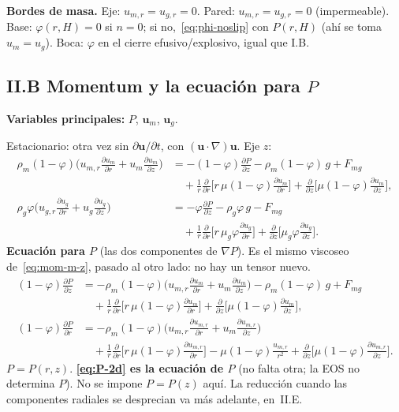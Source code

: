 \documentclass[11pt,a4paper]{article}
\newcommand{\p}{\partial}
\begin{document}
\textbf{Bordes de masa.}
Eje: $u_{m,r}=u_{g,r}=0$.
Pared: $u_{m,r}=u_{g,r}=0$ (impermeable).
Base: $\varphi(r,H)=0$ si $n=0$; si no,~\eqref{eq:phi-noslip}
con $P(r,H)$ (ahí se toma $u_m=u_g$).
Boca: $\varphi$ en el cierre efusivo/explosivo, igual que I.B.

\subsection*{II.B Momentum y la ecuación para $P$}

\textbf{Variables principales:} $P$, $\mathbf{u}_m$,
$\mathbf{u}_g$.

Estacionario: otra vez sin $\p\mathbf{u}/\p t$, con
$(\mathbf{u}\cdot\nabla)\mathbf{u}$. Eje $z$:
\begin{align}
\label{eq:mom-m-z}
\rho_m(1-\varphi)\Biggl(
u_{m,r}\frac{\p u_m}{\p r}+u_m\frac{\p u_m}{\p z}
\Biggr)
&=
-(1-\varphi)\frac{\p P}{\p z}
-\rho_m(1-\varphi)\,g
+F_{mg}
\nonumber\\
&\quad
+\frac{1}{r}\frac{\p}{\p r}\Biggl[
r\,\mu(1-\varphi)\frac{\p u_m}{\p r}
\Biggr]
+\frac{\p}{\p z}\Biggl[
\mu(1-\varphi)\frac{\p u_m}{\p z}
\Biggr],
\\
\label{eq:mom-g-z}
\rho_g\varphi\Biggl(
u_{g,r}\frac{\p u_g}{\p r}+u_g\frac{\p u_g}{\p z}
\Biggr)
&=
-\varphi\frac{\p P}{\p z}
-\rho_g\varphi\,g
-F_{mg}
\nonumber\\
&\quad
+\frac{1}{r}\frac{\p}{\p r}\Biggl[
r\,\mu_g\varphi\frac{\p u_g}{\p r}
\Biggr]
+\frac{\p}{\p z}\Biggl[
\mu_g\varphi\frac{\p u_g}{\p z}
\Biggr].
\end{align}
\textbf{Ecuación para $P$} (las dos componentes de $\nabla P$).
Es el mismo viscoseo de~\eqref{eq:mom-m-z}, pasado al otro
lado: no hay un tensor nuevo.
\begin{equation}
\label{eq:P-2d}
\begin{aligned}
(1-\varphi)\frac{\p P}{\p z}
&=
-\rho_m(1-\varphi)\Biggl(
u_{m,r}\frac{\p u_m}{\p r}+u_m\frac{\p u_m}{\p z}
\Biggr)
-\rho_m(1-\varphi)\,g
+F_{mg}
\\
&\quad
+\frac{1}{r}\frac{\p}{\p r}\Biggl[
r\,\mu(1-\varphi)\frac{\p u_m}{\p r}
\Biggr]
+\frac{\p}{\p z}\Biggl[
\mu(1-\varphi)\frac{\p u_m}{\p z}
\Biggr],
\\[0.4em]
(1-\varphi)\frac{\p P}{\p r}
&=
-\rho_m(1-\varphi)\Biggl(
u_{m,r}\frac{\p u_{m,r}}{\p r}+u_m\frac{\p u_{m,r}}{\p z}
\Biggr)
\\
&\quad
+\frac{1}{r}\frac{\p}{\p r}\Biggl[
r\,\mu(1-\varphi)\frac{\p u_{m,r}}{\p r}
\Biggr]
-\mu(1-\varphi)\frac{u_{m,r}}{r^2}
+\frac{\p}{\p z}\Biggl[
\mu(1-\varphi)\frac{\p u_{m,r}}{\p z}
\Biggr].
\end{aligned}
\end{equation}
$P=P(r,z)$. \textbf{\eqref{eq:P-2d} es la ecuación de $P$}
(no falta otra; la EOS no determina $P$). No se impone
$P=P(z)$ aquí. La reducción cuando las componentes radiales
se desprecian va más adelante, en~II.E.
\end{document}
